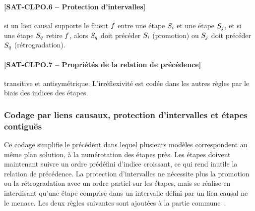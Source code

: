 {\paragraph*{[SAT-CLPO.6 -- Protection d'intervalles]} si un lien causal supporte le
  fluent $f$ entre une étape $S_{i}$ et une étape $S_{j}$, et si une étape $S_{q}$
  retire $f$, alors $S_{q}$ doit précéder $S_{i}$ (promotion) ou $S_{j}$ doit précéder
  $S_{q}$ (rétrogradation).
\paragraph*{[SAT-CLPO.7 -- Propriétés de la relation de précédence]} transitive et
  antisymétrique. L'irréflexivité est codée dans les autres règles par le biais
  des indices des étapes.

\subsubsection{Codage par liens causaux, protection d'intervalles et étapes contiguës}

Ce codage simplifie le précédent dans lequel plusieurs modèles correspondent au
même plan solution, à la numérotation des étapes près. Les étapes doivent
maintenant suivre un ordre prédéfini d'indice croissant, ce qui rend inutile la
relation de précédence. La protection d'intervalles ne nécessite plus la
promotion ou la rétrogradation avec un ordre partiel sur les étapes, mais se
réalise en interdisant qu'une étape comprise dans un intervalle défini par un
lien causal ne le menace. Les deux règles suivantes sont ajoutées à la partie
commune~:

}
